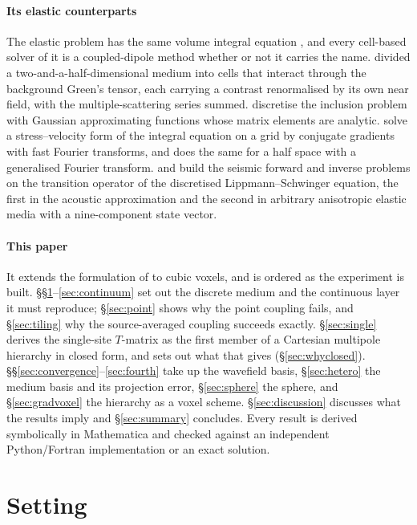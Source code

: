 \documentclass[preprint,review,12pt]{elsarticle}
\begin{document}
\paragraph{Its elastic counterparts} The elastic problem has the same volume integral equation
\citep{Gubernatis1977}, and every cell-based solver of it is a coupled-dipole method whether or not
it carries the name. \citet{Nestor1996} divided a two-and-a-half-dimensional medium into cells that
interact through the background Green's tensor, each carrying a contrast renormalised by its own
near field, with the multiple-scattering series summed. \citet{Kanaun2013} discretise the inclusion
problem with Gaussian approximating functions whose matrix elements are analytic. \citet{Yang2008}
solve a stress--velocity form of the integral equation on a grid by conjugate gradients with fast
Fourier transforms, and \citet{Touhei2011} does the same for a half space with a generalised Fourier
transform. \citet{Jakobsen2012} and \citet{Jakobsen2020} build the seismic forward and inverse problems on the
transition operator of the discretised Lippmann--Schwinger equation, the first in the acoustic
approximation and the second in arbitrary anisotropic elastic media with a nine-component state vector.

\paragraph{This paper} It extends the formulation of \citet{Nestor1996} to cubic voxels, and is
ordered as the experiment is built. \S\S\ref{sec:setting}--\ref{sec:continuum} set out the discrete
medium and the continuous layer it must reproduce; \S\ref{sec:point} shows why the point coupling
fails, and \S\ref{sec:tiling} why the source-averaged coupling succeeds exactly. \S\ref{sec:single}
derives the single-site $T$-matrix as the first member of a Cartesian multipole hierarchy in closed form, and sets
out what that gives (\S\ref{sec:whyclosed}). \S\S\ref{sec:convergence}--\ref{sec:fourth} take up
the wavefield basis, \S\ref{sec:hetero} the medium basis and its projection error,
\S\ref{sec:sphere} the sphere, and \S\ref{sec:gradvoxel} the hierarchy as a voxel scheme.
\S\ref{sec:discussion} discusses what the results imply and \S\ref{sec:summary} concludes. Every
result is derived symbolically in Mathematica and checked against an independent Python/Fortran
implementation or an exact solution.

\section{Setting}\label{sec:setting}
\end{document}
